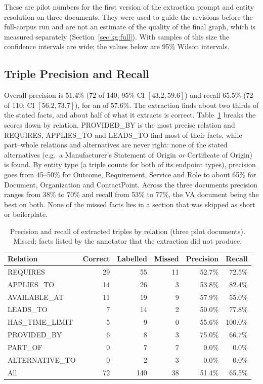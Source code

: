 These are pilot numbers for the first version of the extraction prompt and entity
resolution on three documents. They were used to guide the revisions before the
full-corpus run and are not an estimate of the quality of the final graph, which is
measured separately (Section~\ref{sec:kg:full}). With samples of this size the
confidence intervals are wide; the values below are 95\% Wilson intervals.

\subsection{Triple Precision and Recall}

Overall precision is 51.4\% (72 of 140; 95\% CI $[43.2, 59.6]$) and recall 65.5\% (72
of 110; CI $[56.2, 73.7]$), for an \fone{} of 57.6\%. The extraction finds about two
thirds of the stated facts, and about half of what it extracts is correct.
Table~\ref{tab:kg:precision} breaks the scores down by relation. PROVIDED\_BY is the
most precise relation and REQUIRES, APPLIES\_TO and LEADS\_TO find most of their facts,
while part--whole relations and alternatives are never right: none of the stated
alternatives (e.g.\ a Manufacturer's Statement of Origin \emph{or} Certificate of
Origin) is found. By entity type (a triple counts for both of its endpoint types),
precision goes from 45--50\% for Outcome, Requirement, Service and Role to about 65\% for
Document, Organization and ContactPoint. Across the three documents precision ranges from
38\% to 70\% and recall from 53\% to 77\%, the VA document being the best on both. None of the
missed facts lies in a section that was skipped as short or boilerplate.

\begin{table}[ht]
    \centering
    \caption{Precision and recall of extracted triples by relation (three pilot
             documents). Missed: facts listed by the annotator that the extraction did
             not produce.}
    \label{tab:kg:precision}
    \begin{tabular}{lrrrrr}
        \toprule
        Relation & Correct & Labelled & Missed & Precision & Recall \\
        \midrule
        REQUIRES        & 29 & 55 & 11 & 52.7\% & 72.5\% \\
        APPLIES\_TO     & 14 & 26 &  3 & 53.8\% & 82.4\% \\
        AVAILABLE\_AT   & 11 & 19 &  9 & 57.9\% & 55.0\% \\
        LEADS\_TO       &  7 & 14 &  2 & 50.0\% & 77.8\% \\
        HAS\_TIME\_LIMIT &  5 &  9 &  0 & 55.6\% & 100.0\% \\
        PROVIDED\_BY    &  6 &  8 &  3 & 75.0\% & 66.7\% \\
        PART\_OF        &  0 &  7 &  7 &  0.0\% &  0.0\% \\
        ALTERNATIVE\_TO &  0 &  2 &  3 &  0.0\% &  0.0\% \\
        \midrule
        All             & 72 & 140 & 38 & 51.4\% & 65.5\% \\
        \bottomrule
    \end{tabular}
\end{table}

